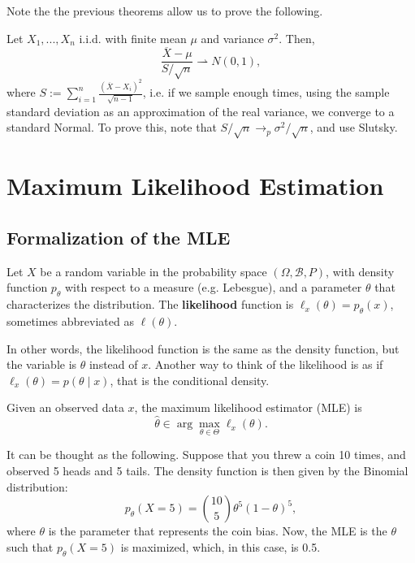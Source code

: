 Note the the previous theorems allow us to prove the following.

\begin{example}
	Let $X_1,...,X_n$ i.i.d. with finite mean $\mu$ and variance $\sigma^2$. Then,
	\begin{equation}
		\frac{\overline X - \mu}{S/\sqrt n} \rightharpoonup N(0,1),
	\end{equation}
	where $S :=  \sum_{i=1}^n \frac{(\overline X - X_i)^2}{\sqrt{n-1}}$, i.e.
	if we sample enough times, using the sample standard deviation as
	an approximation of the real variance, we converge to a standard Normal.
	To prove this, note that $S/\sqrt n \to_p \sigma^2/\sqrt n$, and use
	Slutsky.
\end{example}


\section{Maximum Likelihood Estimation}

\subsection{Formalization of the MLE}

\begin{definition}[Likelihood]
	Let $X$ be a random variable in the probability space $(\Omega, \mathcal B, P)$,
	with density function $p_\theta$ with respect to a measure (e.g. Lebesgue),
	and a parameter $\theta$ that characterizes the distribution.
	The \textbf{likelihood} function is $\ell_x(\theta) = p_\theta(x)$, sometimes
	abbreviated as $\ell(\theta)$.
\end{definition}
In other words, the likelihood function is the
same as the density function, but the variable is $\theta$ instead of $x$.
Another way to think of the likelihood is as if $\ell_x(\theta) = p(\theta \mid x)$,
that is the conditional density.

\begin{definition}
	Given an observed data $x$, the maximum likelihood estimator (MLE) is
	\begin{equation}
		\hat \theta \in \arg\max_{\theta \in \Theta} \ell_x(\theta).
	\end{equation}
\end{definition}

It can be thought as the following. Suppose that you threw a coin
10 times, and observed 5 heads and 5 tails. The density function
is then given by the Binomial distribution:
\begin{equation}
	p_\theta(X=5) = \binom{10}{5}\theta^5 (1-\theta)^5,
\end{equation}
where $\theta$ is the parameter that represents the coin bias. Now,
the MLE is the $\theta$ such that $p_\theta(X=5)$ is maximized, which,
in this case, is 0.5.

